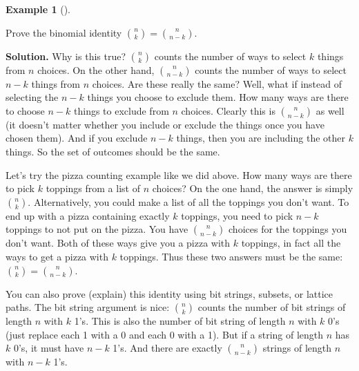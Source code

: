 \documentclass[10pt,]{book}
\theoremstyle{plain}
\theoremstyle{definition}
\newtheorem{example}[theorem]{Example}
\theoremstyle{definition}
\theoremstyle{definition}
\numberwithin{equation}{chapter}
\begin{document}
\begin{example}[]\label{ex_symmetry-formula}

          Prove the binomial identity \({n \choose k} = {n \choose n-k}\).
\par\medskip\noindent%
\textbf{Solution.}\quad
          Why is this true? \({n \choose k}\) counts the number of ways to select \(k\) things from \(n\) choices. On the other hand, \({n \choose n-k}\) counts the number of ways to select \(n-k\) things from \(n\) choices. Are these really the same? Well, what if instead of selecting the \(n-k\) things you choose to exclude them. How many ways are there to choose \(n-k\) things to exclude from \(n\) choices. Clearly this is \({n \choose n-k}\) as well (it doesn't matter whether you include or exclude the things once you have chosen them). And if you exclude \(n-k\) things, then you are including the other \(k\) things. So the set of outcomes should be the same.
\par

          Let's try the pizza counting example like we did above. How many ways are there to pick \(k\) toppings from a list of \(n\) choices? On the one hand, the answer is simply \({n \choose k}\). Alternatively, you could make a list of all the toppings you don't want. To end up with a pizza containing exactly \(k\) toppings, you need to pick \(n-k\) toppings to not put on the pizza. You have \({n \choose n-k}\) choices for the toppings you don't want. Both of these ways give you a pizza with \(k\) toppings, in fact all the ways to get a pizza with \(k\) toppings. Thus these two answers must be the same: \({n \choose k} = {n \choose n-k}\).
\par

          You can also prove (explain) this identity using bit strings, subsets, or lattice paths. The bit string argument is nice: \({n \choose k}\) counts the number of bit strings of length \(n\) with \(k\) 1's. This is also the number of bit string of length \(n\) with \(k\) 0's (just replace each 1 with a 0 and each 0 with a 1). But if a string of length \(n\) has \(k\) 0's, it must have \(n-k\) 1's. And there are exactly \({n\choose n-k}\) strings of length \(n\) with \(n-k\) 1's.
\end{example}
\end{document}

